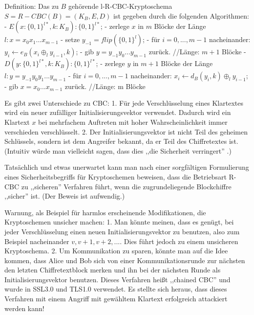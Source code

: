 \documentclass[a4paper]{article}
\begin{document}
\begin{multicols}{3}
    Definition: Das zu $B$ gehörende l-R-CBC-Kryptoschema $S=R-CBC(B) = (K_B,E,D)$ ist gegeben durch die folgenden Algorithmen:
    - $E(x:\{0,1\}^{l*},k:K_B) :\{0,1\}^{l*}$;
    - zerlege $x$ in $m$ Blöcke der Länge $l:x=x_0 x_1 ...x_{m-1}$
    - setze $y_{-1}= flip(\{0,1\}^l)$;
    - für $i=0,...,m-1$ nacheinander: $y_i\leftarrow e_B(x_i\oplus_l y_{i-1} ,k)$;
    - gib $y=y_{-1} y_0 ...y_{m-1}$ zurück. //Länge: $m+1$ Blöcke
    - $D(y:\{0,1\}^{l*},k:K_B) :\{0,1\}^{l*}$;
    - zerlege $y$ in $m+1$ Blöcke der Länge $l:y=y_{-1} y_0 y_1 ...y_{m-1}$
    - für $i=0,...,m-1$ nacheinander: $x_i\leftarrow d_B(y_i,k)\oplus_l y_{i-1}$;
    - gib $x=x_0 ...x_{m-1}$ zurück. //Länge: m Blöcke

    Es gibt zwei Unterschiede zu CBC:
    1. Für jede Verschlüsselung eines Klartextes wird ein neuer zufälliger Initialisierungsvektor verwendet. Dadurch wird ein Klartext $x$ bei mehrfachem Auftreten mit hoher Wahrscheinlichkeit immer verschieden verschlüsselt.
    2. Der Initialisierungsvektor ist nicht Teil des geheimen Schlüssels, sondern ist dem Angreifer bekannt, da er Teil des Chiffretextes ist. (Intuitiv würde man vielleicht sagen, dass dies ,,die Sicherheit verringert'' .)

    Tatsächlich und etwas unerwartet kann man nach einer sorgfältigen Formulierung eines Sicherheitsbegriffs für Kryptoschemen beweisen, dass die Betriebsart R-CBC zu ,,sicheren'' Verfahren führt, wenn die zugrundeliegende Blockchiffre ,,sicher'' ist. (Der Beweis ist
    aufwendig.)

    Warnung, als Beispiel für harmlos erscheinende Modifikationen, die Kryptoschemen unsicher machen:
    1. Man könnte meinen, dass es genügt, bei jeder Verschlüsselung einen neuen Initialisierungsvektor zu benutzen, also zum Beispiel nacheinander $v,v+1,v+2,...$. Dies führt jedoch zu einem unsicheren Kryptoschema.
    2. Um Kommunikation zu sparen, könnte man auf die Idee kommen, dass Alice und Bob sich von einer Kommunikationsrunde zur nächsten den letzten Chiffretextblock merken und ihn bei der nächsten Runde als Initialisierungsvektor benutzen. Dieses Verfahren heißt ,,chained CBC'' und wurde in SSL3.0 und TLS1.0 verwendet. Es stellte sich heraus, dass dieses Verfahren mit einem Angriff mit gewähltem Klartext erfolgreich attackiert werden kann!


\end{multicols}
\end{document}
